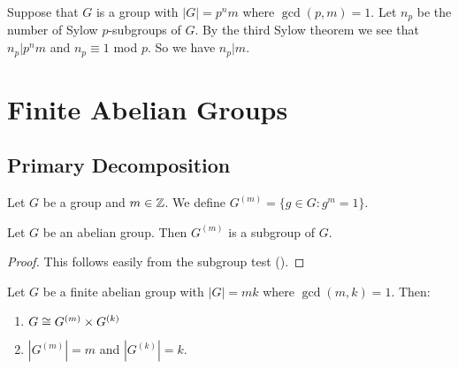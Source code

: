 \documentclass[11pt]{article}
\begin{document}
\begin{note}
    Suppose that $G$ is a group with $|G|=p^nm$ where $\gcd(p,m)=1$. Let $n_p$ be the number of Sylow $p$-subgroups of $G$. By the third Sylow theorem we see that $n_p|p^nm$ and $n_p\equiv1$ mod $p$. So we have $n_p|m$.
\end{note}

\section{Finite Abelian Groups}

\subsection{Primary Decomposition}

\begin{notation}
    Let $G$ be a group and $m\in\mathbb{Z}$. We define $G^{(m)}=\{g\in G:g^m=1\}$.
\end{notation}

\begin{proposition}
    Let $G$ be an abelian group. Then $G^{(m)}$ is a subgroup of $G$.
\end{proposition}

\begin{proof}
    This follows easily from the subgroup test ().
\end{proof}

\begin{proposition}
    Let $G$ be a finite abelian group with $|G|=mk$ where $\gcd(m,k)=1$. Then:
    \begin{enumerate}
        \item $G\cong G^{(m)}\times G^{(k)}$
        \item $\left|G^{(m)}\right|=m$ and $\left|G^{(k)}\right|=k$.
    \end{enumerate}
\end{proposition}
\end{document}
